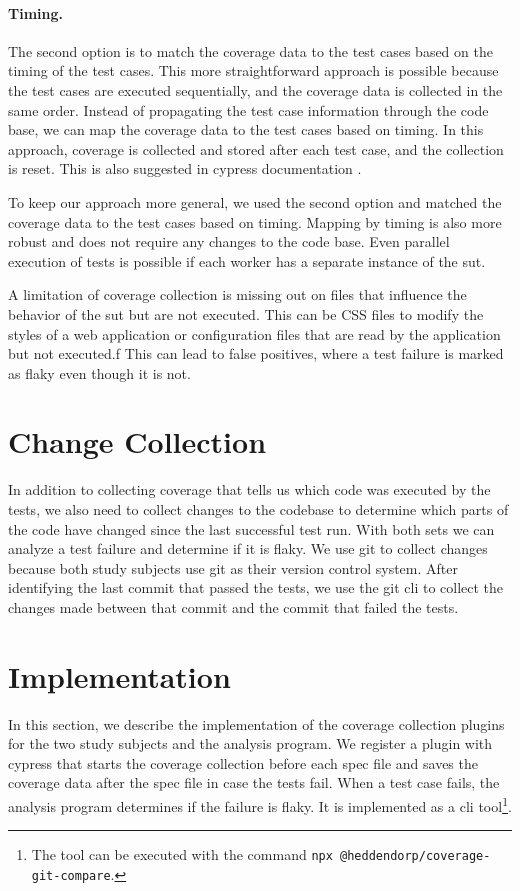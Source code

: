 \paragraph{Timing.} The second option is to match the coverage data to the test cases based on the timing of the test cases.
This more straightforward approach is possible because the test cases are executed sequentially, and the coverage data is collected in the same order.
Instead of propagating the test case information through the code base, we can map the coverage data to the test cases based on timing.
In this approach, coverage is collected and stored after each test case, and the collection is reset.
This is also suggested in cypress documentation \autocite{noauthor_code_nodate}.

To keep our approach more general, we used the second option and matched the coverage data to the test cases based on timing.
Mapping by timing is also more robust and does not require any changes to the code base.
Even parallel execution of tests is possible if each worker has a separate instance of the \ac{sut}.

A limitation of coverage collection is missing out on files that influence the behavior of the \ac{sut} but are not executed.
This can be CSS files to modify the styles of a web application or configuration files that are read by the application but not executed.f
This can lead to false positives, where a test failure is marked as flaky even though it is not.
\section{Change Collection}
In addition to collecting coverage that tells us which code was executed by the tests, we also need to collect changes to the codebase to determine which parts of the code have changed since the last successful test run.
With both sets we can analyze a test failure and determine if it is flaky.
We use git to collect changes because both study subjects use git as their version control system.
After identifying the last commit that passed the tests, we use the git \ac{cli} to collect the changes made between that commit and the commit that failed the tests.

\section{Implementation}
In this section, we describe the implementation of the coverage collection plugins for the two study subjects and the analysis program.
We register a plugin with cypress that starts the coverage collection before each spec file and saves the coverage data after the spec file in case the tests fail.
When a test case fails, the analysis program determines if the failure is flaky.
It is implemented as a \ac{cli} tool\footnote{The tool can be executed with the command \texttt{npx @heddendorp/coverage-git-compare}.}.

